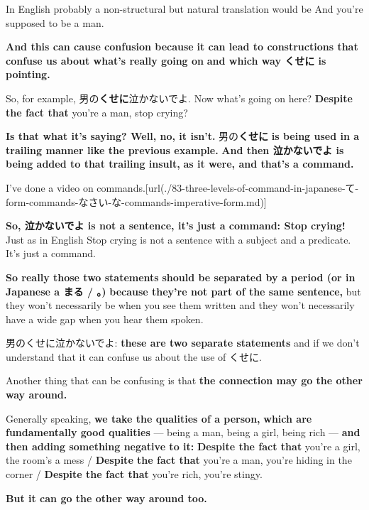 In English probably a non-structural but natural translation would be And you're supposed to be a man.

\thinrule

{\bf And this can cause confusion because} {\bf it can lead to constructions that confuse us about what's really going on} {\bf and which way くせに is pointing.}

\thinrule

So, for example, 男の{\bf くせに}泣かないでよ. Now what's going on here? {\bf Despite the fact that} you're a man, stop crying?

{}

{\bf Is that what it's saying? Well, no, it isn't.} 男の{\bf くせに} {\bf is being used in a trailing manner like the previous example.} {\bf And then 泣かないでよ is being added to that trailing insult,} {\bf as it were, and that's a command.}

I've done a video on commands.\goto{{[}83{]}}[url(./83-three-levels-of-command-in-japanese-て-form-commands-なさい-な-commands-imperative-form.md)]

{\bf So, 泣かないでよ is not a sentence, it's just a command: Stop crying!} Just as in English Stop crying is not a sentence with a subject and a predicate. It's just a command.

{\bf So really those two statements} {\bf should be separated by a period (or in Japanese a まる / 。)} {\bf because they're not part of the same sentence,} but they won't necessarily be when you see them written and they won't necessarily have a wide gap when you hear them spoken.

男のくせに泣かないでよ: {\bf these are two separate statements} and if we don't understand that it can confuse us about the use of くせに.

\thinrule

Another thing that can be confusing is that {\bf the connection may go the other way around.}

Generally speaking, {\bf we take the qualities of a person,} {\bf which are fundamentally good qualities} --- being a man, being a girl, being rich --- {\bf and then adding something negative to it:} {\bf Despite the fact that} you're a girl, the room's a mess / {\bf Despite the fact that} you're a man, you're hiding in the corner / {\bf Despite the fact that} you're rich, you're stingy.

\thinrule

{\bf But it can go the other way around too.}

